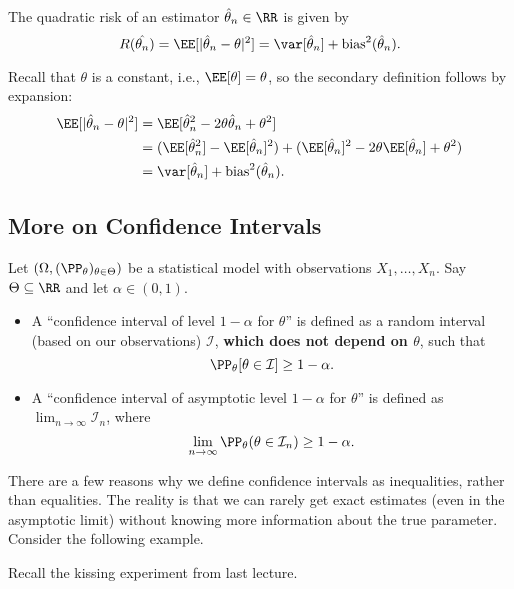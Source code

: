 \begin{definition}

The \ac{quadratic risk} of an estimator $\hat{\theta}_n\in \RR$ is given by 
\[R(\hat{\theta_n}) = \EE[\vert \hat{\theta}_n-\theta\vert^2] = \var[\hat{\theta}_n] + \text{bias}^2(\hat{\theta}_n).\]
\end{definition}

Recall that $\theta$ is a constant, i.e., $\EE[\theta] = \theta$, so the secondary definition follows by expansion:
\begin{align*}
    \EE[\vert \hat{\theta}_n - \theta\vert^2] &= \EE[\hat{\theta}_n^2 - 2\theta\hat{\theta}_n + \theta^2] \\
    &= (\EE[\hat{\theta}_n^2] - \EE[\hat{\theta}_n]^2) + (\EE[\hat{\theta}_n]^2 - 2\theta\EE[\hat{\theta}_n] + \theta^2) \\
    &= \var[\hat{\theta}_n] + \text{bias}^2(\hat{\theta}_n).
\end{align*}

\subsection{More on Confidence Intervals}

Let $(\Omega, (\PP_{\theta})_{\theta\in \Theta})$ be a statistical model with observations $X_1, \hdots, X_n$. Say $\Theta\subseteq \RR$ and let $\alpha\in (0,1)$. 
\begin{itemize}
    \item A ``confidence interval of level $1-\alpha$ for $\theta$'' is defined as a random interval (based on our observations) $\mathcal{I}$, \textbf{which does not depend on $\theta$}, such that
    \[\PP_{\theta}[\theta \in \mathcal{I}] \geq 1-\alpha.\]
    \item A ``confidence interval of asymptotic level $1-\alpha$ for $\theta$'' is defined as $\lim_{n\rightarrow \infty}\mathcal{I}_n$, where 
    \[\lim_{n\rightarrow \infty}\PP_{\theta}(\theta \in \mathcal{I}_n) \geq 1-\alpha.\]
\end{itemize}

There are a few reasons why we define confidence intervals as inequalities, rather than equalities. The reality is that we can rarely get exact estimates (even in the asymptotic limit) without knowing more information about the true parameter. Consider the following example. 

\begin{example}
\exlabel

Recall the kissing experiment from last lecture.
\end{example}

